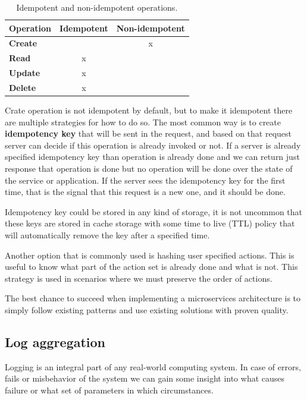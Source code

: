 \begin{table}[h!]
	\begin{center}
		\begin{tabular}{l|c|c}
			\textbf{Operation} & \textbf{Idempotent} & \textbf{Non-idempotent}\\
			\hline
			\textbf{Create} &  & x \\
			\textbf{Read} & x & \\
			\textbf{Update} & x & \\
			\textbf{Delete} & x & \\
		\end{tabular}
	\end{center}
	\vspace{-0.5cm}
	\caption{Idempotent and non-idempotent operations.}
	\label{tab:table8}
\end{table}

Crate operation is not idempotent by default, but to make it idempotent there are multiple strategies for how to do so. The most common way is to create \textbf{idempotency key} that will be sent in the request, and based on that request server can decide if this operation is already invoked or not. If a server is already  specified idempotency key than operation is already done and we can return just response that operation is done but no operation will be done over the state of the service or application. If the server sees the idempotency key for the first time, that is the signal that this request is a new one, and it should be done.

Idempotency key could be stored in any kind of storage, it is not uncommon that these keys are stored in cache storage with some time to live (TTL) policy that will automatically remove the key after a specified time.

Another option that is commonly used is hashing user specified actions. This is useful to know what part of the action set is already done and what is not. This strategy is used in scenarios where we must preserve the order of actions.

The best chance to succeed when implementing a microservices architecture is to simply follow existing patterns and use existing solutions with proven quality.
%
%
\subsection{Log aggregation}\label{sec:log_aggregation}
%
Logging is an integral part of any real-world computing system. In case of errors, fails or misbehavior of the system we can gain some insight into what causes failure or what set of parameters in which circumstances.

